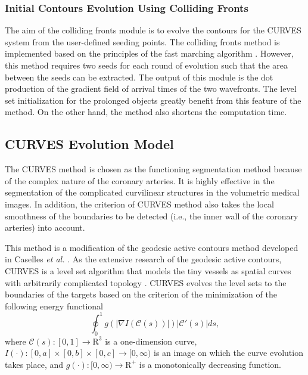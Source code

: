 \subsubsection{Initial Contours Evolution Using Colliding Fronts}

The aim of the colliding fronts module is to evolve the contours for the CURVES system from the user-defined seeding points.
The colliding fronts method is implemented based on the principles of the fast marching algorithm \cite{Sethian1999}.
However, this method requires two seeds for each round of evolution such that the area between the seeds can be extracted.
The output of this module is the dot production of the gradient field of arrival times of the two wavefronts.
The level set initialization for the prolonged objects greatly benefit from this feature of the method.
On the other hand, the method also shortens the computation time.

\subsection{CURVES Evolution Model}

The CURVES method \cite{Lorigo2001} is chosen as the functioning segmentation method because of the complex nature of the coronary arteries.
It is highly effective in the segmentation of the complicated curvilinear structures in the volumetric medical images.
In addition, the criterion of CURVES method also takes the local smoothness of the boundaries to be detected (i.e., the inner wall of the coronary arteries) into account.

This method is a modification of the geodesic active contours method developed in Caselles \textit{et al.} \cite{Caselles1997}.
As the extensive research of the geodesic active contours, CURVES is a level set algorithm that models the tiny vessels as spatial curves with arbitrarily complicated topology \cite{Lorigo2001}. %
CURVES evolves the level sets to the boundaries of the targets based on the criterion of the minimization of the following energy functional
\begin{equation}
\label{eqn:CURVES}
\oint_0^1 g\left( \left| \nabla I \left( \mathcal{C} \left(  s \right) \right) \right| \right) \left| \mathcal{C}'\left( s \right) \right| ds,
\end{equation}
where $\mathcal{C}\left( s \right): [0,1] \rightarrow \mathrm{R}^3$ is a one-dimension curve, $I\left( \cdot \right): [0, a] \times [0, b] \times [0, c] \rightarrow [0, \infty)$ is an image on which the curve evolution takes place, and $g\left( \cdot \right): [0, \infty) \rightarrow \mathrm{R}^+$ is a monotonically decreasing function. %


